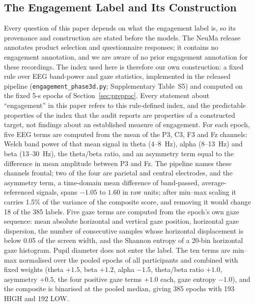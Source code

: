 \documentclass[pdflatex,sn-basic,Numbered,twocolumn,iicol]{sn-jnl}
\theoremstyle{thmstyleone}%
\theoremstyle{thmstyletwo}%
\theoremstyle{thmstylethree}%
\begin{document}
\subsection{The Engagement Label and Its Construction}\label{sec:label}

Every question of this paper depends on what the engagement label is, so its provenance and construction are stated before the models. The NeuMa release annotates product selection and questionnaire responses; it contains no engagement annotation, and we are aware of no prior engagement annotation for these recordings. The index used here is therefore our own construction: a fixed rule over EEG band-power and gaze statistics, implemented in the released pipeline (\texttt{engagement\_phase3d.py}; Supplementary Table~S5) and computed on the fixed 5-s epochs of Section~\ref{sec:preproc}. Every statement about ``engagement'' in this paper refers to this rule-defined index, and the predictable properties of the index that the audit reports are properties of a constructed target, not findings about an established measure of engagement. For each epoch, five EEG terms are computed from the mean of the P3, C3, F3 and Fz channels: Welch band power of that mean signal in theta (4--8~Hz), alpha (8--13~Hz) and beta (13--30~Hz), the theta/beta ratio, and an asymmetry term equal to the difference in mean amplitude between P3 and Fz. The pipeline names these channels frontal; two of the four are parietal and central electrodes, and the asymmetry term, a time-domain mean difference of band-passed, average-referenced signals, spans $-1.05$ to $1.60$ in raw units; after min--max scaling it carries 1.5\% of the variance of the composite score, and removing it would change 18 of the 385 labels. Five gaze terms are computed from the epoch's own gaze sequence: mean absolute horizontal and vertical gaze position, horizontal gaze dispersion, the number of consecutive samples whose horizontal displacement is below 0.05 of the screen width, and the Shannon entropy of a 20-bin horizontal gaze histogram. Pupil diameter does not enter the label. The ten terms are min--max normalised over the pooled epochs of all participants and combined with fixed weights (theta $+1.5$, beta $+1.2$, alpha $-1.5$, theta/beta ratio $+1.0$, asymmetry $+0.5$, the four positive gaze terms $+1.0$ each, gaze entropy $-1.0$), and the composite is binarised at the pooled median, giving 385 epochs with 193 HIGH and 192 LOW.
\end{document}
